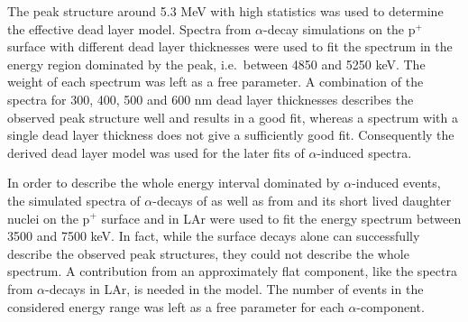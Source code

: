 The  peak structure around 5.3 MeV with high statistics was used to determine the effective dead layer model. Spectra from  $\alpha$-decay simulations on the p$^+$ surface with different dead layer thicknesses were used to fit the spectrum in the energy region dominated by the  peak, i.e.~between 4850 and 5250 keV. The weight of each spectrum was left as a free parameter. A combination of the spectra for 300, 400, 500 and 600 nm dead layer thicknesses describes the observed peak structure well and results in a good fit, whereas a spectrum with a single dead layer thickness does not give a sufficiently good fit. Consequently the derived dead layer model was used for the later fits of $\alpha$-induced spectra.

In order to describe the whole energy interval dominated by $\alpha$-induced events, the simulated spectra of $\alpha$-decays of  as well as from  and its short lived daughter nuclei on the p$^+$ surface and in LAr were used to fit the energy spectrum between 3500 and 7500 keV. In fact, while the surface decays alone can successfully describe the observed peak structures, they could not describe the whole spectrum. A contribution from an approximately flat component, like the spectra from $\alpha$-decays in LAr, is needed in the model. The number of events in the considered energy range was left as a free parameter for each $\alpha$-component.

